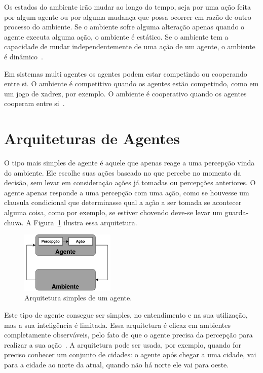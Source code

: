Os estados do ambiente irão mudar ao longo do tempo, seja por uma ação feita por algum agente ou por alguma mudança que possa ocorrer em razão de outro processo do ambiente.
Se o ambiente sofre alguma alteração apenas quando o agente executa alguma ação, o ambiente é estático. Se o ambiente tem a capacidade de mudar independentemente de uma ação de um agente, o ambiente é dinâmico~\cite{agent1999}.

Em sistemas multi agentes os agentes podem estar competindo ou cooperando entre si. O ambiente é competitivo quando os agentes estão competindo, como em um jogo de xadrez, por exemplo. 
O ambiente é cooperativo quando os agentes cooperam entre si~\cite[Capítulo 2]{intelligence2003modern}.

\section{Arquiteturas de Agentes}


O tipo mais simples de agente é aquele que apenas reage a uma percepção vinda do ambiente. Ele escolhe suas ações baseado no que percebe no momento da decisão, sem levar em consideração ações já tomadas ou percepções anteriores. O agente apenas responde a uma percepção com uma ação, como se houvesse um clausula condicional que determinasse qual a ação a ser tomada se acontecer alguma coisa, como por exemplo, se estiver chovendo deve-se levar um guarda-chuva. A Figura~\ref{fig:agenteSimple} ilustra essa arquitetura. 

\begin{figure}[ht]
	\centering
	\includegraphics[width=0.4\textwidth]{fig/agentSimple.pdf}
	\caption{Arquitetura simples de um agente.}
	\label{fig:agenteSimple}
\end{figure} 


Este tipo de agente consegue ser simples, no entendimento e na sua utilização, mas a sua inteligência é limitada. Essa arquitetura é eficaz em ambientes completamente observáveis, pelo fato de que o agente precisa da percepção para realizar a sua ação~\cite[Capítulo 7]{intelligence2003modern}. A arquitetura pode ser usada, por exemplo, quando for preciso conhecer um conjunto de cidades: o agente após chegar a uma cidade, vai para a cidade ao norte da atual, quando não há norte ele vai para oeste. 

